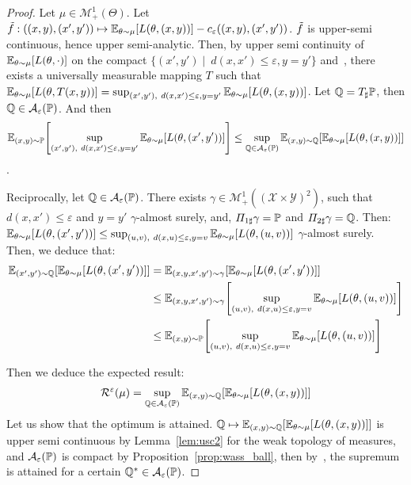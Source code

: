 \begin{proof}
Let $\mu\in\mathcal{M}^1_+(\Theta)$. Let $\Tilde{f}:((x,y),(x',y'))\mapsto \mathbb{E}_{\theta\sim\mu}\left[\loss(\theta,(x,y))\right]-c_\varepsilon((x,y),(x',y'))$. $\Tilde{f}$ is upper-semi continuous, hence upper semi-analytic. Then, by upper semi continuity of $\mathbb{E}_{\theta\sim\mu}\left[\loss(\theta,\cdot)\right]$ on the compact $\{(x',y')\mid~d(x,x')\leq\varepsilon,y=y'\}$ and~\citep[Proposition 7.50]{bertsekas2004stochastic}, there exists a universally measurable mapping $T$ such that $\mathbb{E}_{\theta\sim\mu}\left[\loss(\theta,T(x,y))\right]=\sup_{(x',y'),~d(x,x')\leq\varepsilon,y=y'}\mathbb{E}_{\theta\sim\mu}\left[\loss(\theta,(x,y))\right]$.  Let $\mathbb{Q} = T_{\sharp}\mathbb{P}$, then $\mathbb{Q}\in\mathcal{A}_\varepsilon(\mathbb{P})$. And then $$\mathbb{E}_{(x,y)\sim\PP}\left[\sup_{(x',y'),~d(x,x')\leq\varepsilon,y=y'}\mathbb{E}_{\theta\sim\mu}\left[\loss(\theta,(x',y'))\right]\right]\leq \sup_{\QQ\in\mathcal{A}_\varepsilon(\PP)}\mathbb{E}_{(x,y)\sim\QQ}\left[\mathbb{E}_{\theta\sim\mu}\left[\loss(\theta,(x,y))\right]\right]$$.

Reciprocally, let $\mathbb{Q}\in\mathcal{A}_\varepsilon(\mathbb{P})$. There exists $\gamma\in\mathcal{M}^1_+((\mathcal{X}\times\mathcal{Y})^2)$, such that $d(x,x')\leq\varepsilon$ and $y=y'$ $\gamma$-almost surely, and, $\Pi_{1\sharp}\gamma=\mathbb{P}$ and  $\Pi_{2\sharp}\gamma=\mathbb{Q}$. Then:
$\mathbb{E}_{\theta\sim\mu}\left[\loss(\theta,(x',y'))\right]\leq\sup_{(u,v),~d(x,u)\leq\varepsilon,y=v}\mathbb{E}_{\theta\sim\mu}\left[\loss(\theta,(u,v))\right]$ $\gamma$-almost surely. Then, we deduce that:
\begin{align*}
    \mathbb{E}_{(x',y')\sim\QQ}\left[\mathbb{E}_{\theta\sim\mu}\left[\loss(\theta,(x',y'))\right]\right]& =     \mathbb{E}_{(x,y,x',y')\sim\gamma}\left[\mathbb{E}_{\theta\sim\mu}\left[\loss(\theta,(x',y'))\right]\right] \\
    &\leq\mathbb{E}_{(x,y,x',y')\sim\gamma}\left[\sup_{(u,v),~d(x,u)\leq\varepsilon,y=v}\mathbb{E}_{\theta\sim\mu}\left[\loss(\theta,(u,v))\right]\right]\\
    &\leq\mathbb{E}_{(x,y)\sim\PP}\left[\sup_{(u,v),~d(x,u)\leq\varepsilon,y=v}\mathbb{E}_{\theta\sim\mu}\left[\loss(\theta,(u,v))\right]\right]
\end{align*}

Then we deduce the expected result:
\begin{align*}
\risk^\varepsilon(\mu)= \sup_{\QQ\in\mathcal{A}_\varepsilon(\PP)}\mathbb{E}_{(x,y)\sim\QQ}\left[\mathbb{E}_{\theta\sim\mu}\left[\loss(\theta,(x,y))\right]\right]
\end{align*}
Let us show that the optimum is attained. $\QQ\mapsto\mathbb{E}_{(x,y)\sim\QQ}\left[\mathbb{E}_{\theta\sim\mu}\left[\loss(\theta,(x,y))\right]\right]$ is upper semi continuous by Lemma~\ref{lem:usc2} for the weak topology of measures, and $\mathcal{A}_\varepsilon(\mathbb{P})$ is compact by Proposition~\ref{prop:wass_ball}, then by~\citep[Proposition 7.32]{bertsekas2004stochastic}, the supremum is attained for a certain $\mathbb{Q}^*\in\mathcal{A}_\varepsilon(\mathbb{P})$. 

\end{proof}

